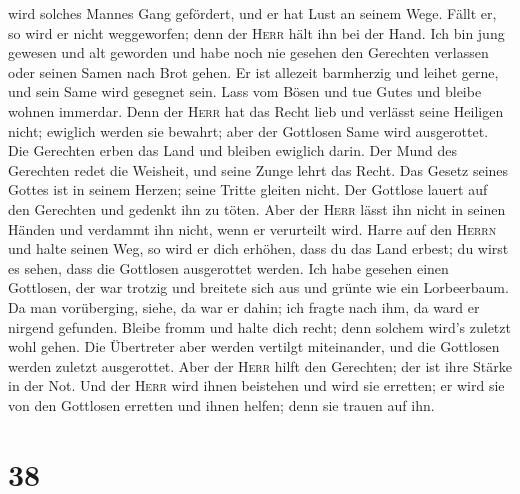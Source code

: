 wird solches Mannes Gang gefördert, und er hat Lust an seinem Wege.
 Fällt er, so wird er nicht weggeworfen; denn der
\textsc{Herr} hält ihn bei der Hand.  Ich bin jung
gewesen und alt geworden und habe noch nie gesehen den Gerechten
verlassen oder seinen Samen nach Brot gehen.  Er ist
allezeit barmherzig und leihet gerne, und sein Same wird gesegnet sein.
 Lass vom Bösen und tue Gutes und bleibe wohnen immerdar.
 Denn der \textsc{Herr} hat das Recht lieb und verlässt
seine Heiligen nicht; ewiglich werden sie bewahrt; aber der Gottlosen
Same wird ausgerottet.  Die Gerechten erben das Land und
bleiben ewiglich darin.  Der Mund des Gerechten redet die
Weisheit, und seine Zunge lehrt das Recht.  Das Gesetz
seines Gottes ist in seinem Herzen; seine Tritte gleiten nicht.
 Der Gottlose lauert auf den Gerechten und gedenkt ihn zu
töten.  Aber der \textsc{Herr} lässt ihn nicht in seinen
Händen und verdammt ihn nicht, wenn er verurteilt wird. 
Harre auf den \textsc{Herrn} und halte seinen Weg, so wird er dich
erhöhen, dass du das Land erbest; du wirst es sehen, dass die Gottlosen
ausgerottet werden.  Ich habe gesehen einen Gottlosen,
der war trotzig und breitete sich aus und grünte wie ein Lorbeerbaum.
 Da man vorüberging, siehe, da war er dahin; ich fragte
nach ihm, da ward er nirgend gefunden.  Bleibe fromm und
halte dich recht; denn solchem wird's zuletzt wohl gehen.
 Die Übertreter aber werden vertilgt miteinander, und die
Gottlosen werden zuletzt ausgerottet.  Aber der
\textsc{Herr} hilft den Gerechten; der ist ihre Stärke in der Not.
 Und der \textsc{Herr} wird ihnen beistehen und wird sie
erretten; er wird sie von den Gottlosen erretten und ihnen helfen; denn
sie trauen auf ihn.

\hypertarget{section-37}{%
\section{38}\label{section-37}}

